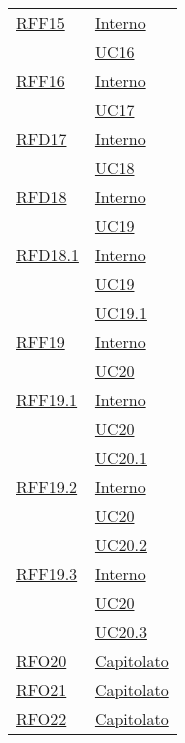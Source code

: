 \begin{longtable}{|>{\centering}m{5cm}|m{5cm}<{\centering}|}
\hyperlink{RFF15}{RFF15} & \hyperlink{Interno}{Interno}\\
& \hyperref[UC16]{UC16}\\ \hline

\hyperlink{RFF16}{RFF16} & \hyperlink{Interno}{Interno}\\
& \hyperref[UC17]{UC17}\\ \hline

\hyperlink{RFD17}{RFD17} & \hyperlink{Interno}{Interno}\\
& \hyperref[UC18]{UC18}\\ \hline

\hyperlink{RFD18}{RFD18} & \hyperlink{Interno}{Interno}\\
& \hyperref[UC19]{UC19}\\ \hline

\hyperlink{RFD18.1}{RFD18.1} & \hyperlink{Interno}{Interno}\\
& \hyperref[UC19]{UC19}\\
& \hyperref[UC19.1]{UC19.1}\\ \hline

\hyperlink{RFF19}{RFF19} & \hyperlink{Interno}{Interno}\\
& \hyperref[UC20]{UC20}\\ \hline

\hyperlink{RFF19.1}{RFF19.1} & \hyperlink{Interno}{Interno}\\
& \hyperref[UC20]{UC20}\\
& \hyperref[UC20.1]{UC20.1}\\ \hline

\hyperlink{RFF19.2}{RFF19.2} & \hyperlink{Interno}{Interno}\\
& \hyperref[UC20]{UC20}\\
& \hyperref[UC20.2]{UC20.2}\\ \hline

\hyperlink{RFF19.3}{RFF19.3} & \hyperlink{Interno}{Interno}\\
& \hyperref[UC20]{UC20}\\
& \hyperref[UC20.3]{UC20.3}\\ \hline

\hyperlink{RFO20}{RFO20} & \hyperlink{Capitolato}{Capitolato}\\ \hline

\hyperlink{RFO21}{RFO21} & \hyperlink{Capitolato}{Capitolato}\\ \hline

\hyperlink{RFO22}{RFO22} & \hyperlink{Capitolato}{Capitolato}\\ \hline


\end{longtable}
